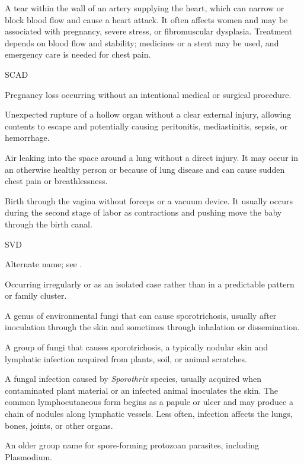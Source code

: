  A tear within the wall of an artery supplying the heart, which can narrow or block blood flow and cause a heart attack. It often affects women and may be associated with pregnancy, severe stress, or fibromuscular dysplasia. Treatment depends on blood flow and stability; medicines or a stent may be used, and emergency care is needed for chest pain.

\synonyms
SCAD

 Pregnancy loss occurring without an intentional medical or surgical procedure.

 Unexpected rupture of a hollow organ without a clear external injury, allowing contents to escape and potentially causing peritonitis, mediastinitis, sepsis, or hemorrhage.

 Air leaking into the space around a lung without a direct injury. It may occur in an otherwise healthy person or because of lung disease and can cause sudden chest pain or breathlessness.

 Birth through the vagina without forceps or a vacuum device. It usually occurs during the second stage of labor as contractions and pushing move the baby through the birth canal.

\synonyms
SVD

 Alternate name; see .

 Occurring irregularly or as an isolated case rather than in a predictable pattern or family cluster.

 A genus of environmental fungi that can cause sporotrichosis, usually after inoculation through the skin and sometimes through inhalation or dissemination.

 A group of fungi that causes sporotrichosis, a typically nodular skin and lymphatic infection acquired from plants, soil, or animal scratches.

 A fungal infection caused by \textit{Sporothrix} species, usually acquired when contaminated plant material or an infected animal inoculates the skin. The common lymphocutaneous form begins as a papule or ulcer and may produce a chain of nodules along lymphatic vessels. Less often, infection affects the lungs, bones, joints, or other organs.

 An older group name for spore-forming protozoan parasites, including Plasmodium.

